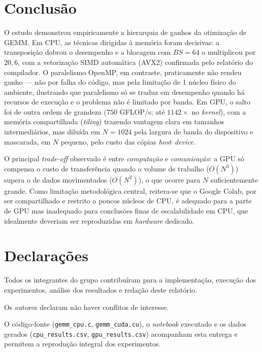 \documentclass{sbc2023}%
\begin{document}
\section{Conclusão}
\label{sec:conclusao}

O estudo demonstrou empiricamente a hierarquia de ganhos da otimização de GEMM. Em CPU, as técnicas dirigidas à memória foram decisivas: a transposição dobrou o desempenho e a blocagem com $BS=64$ o multiplicou por $20{,}6$, com a vetorização SIMD automática (AVX2) confirmada pelo relatório do compilador. O paralelismo OpenMP, em contraste, praticamente não rendeu ganho --- não por falha do código, mas pela limitação de 1 núcleo físico do ambiente, ilustrando que paralelismo só se traduz em desempenho quando há recursos de execução e o problema não é limitado por banda. Em GPU, o salto foi de outra ordem de grandeza ($750$ GFLOP/s; até $1142\times$ no \textit{kernel}), com a memória compartilhada (\textit{tiling}) trazendo vantagem clara em tamanhos intermediários, mas diluída em $N=1024$ pela largura de banda do dispositivo e mascarada, em $N$ pequeno, pelo custo das cópias \textit{host}--\textit{device}.

O principal \textit{trade-off} observado é entre \emph{computação} e \emph{comunicação}: a GPU só compensa o custo de transferência quando o volume de trabalho ($O(N^3)$) supera o de dados movimentados ($O(N^2)$), o que ocorre para $N$ suficientemente grande. Como limitação metodológica central, reitera-se que o Google Colab, por ser compartilhado e restrito a poucos núcleos de CPU, é adequado para a parte de GPU mas inadequado para conclusões finas de escalabilidade em CPU, que idealmente deveriam ser reproduzidas em \textit{hardware} dedicado.


\section*{Declarações}

\begin{contributions}
Todos os integrantes do grupo contribuíram para a implementação, execução dos experimentos, análise dos resultados e redação deste relatório. %
\end{contributions}

\begin{interests}
Os autores declaram não haver conflitos de interesse.
\end{interests}

\begin{materials}
O código-fonte (\texttt{gemm\_cpu.c}, \texttt{gemm\_cuda.cu}), o \textit{notebook} executado e os dados gerados (\texttt{cpu\_results.csv}, \texttt{gpu\_results.csv}) acompanham esta entrega e permitem a reprodução integral dos experimentos.
\end{materials}
\end{document}

